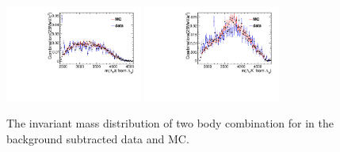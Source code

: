 \begin{figure}[bth]
\includegraphics[width=0.4\textwidth]{Figures/05_open_charm/04_tune/new_for_note/LcLbPi_M_con.pdf}%
\includegraphics[width=0.4\textwidth]{Figures/05_open_charm/04_tune/new_for_note/LcLbKm_M_con.pdf}\\%
\caption{The invariant mass distribution of  two body combination for \LbLckkpi in the background subtracted data and MC.}
\label{fig.Resonance_2body}
\end{figure}  

